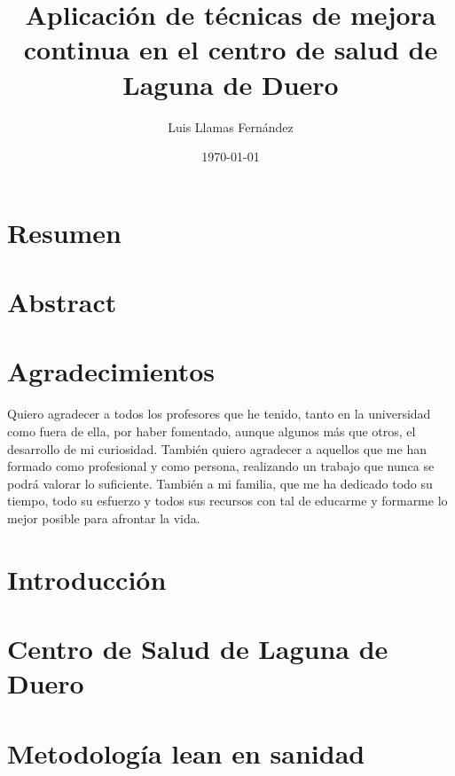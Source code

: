 \documentclass[12pt, a4paper, twoside, openright]{report}
\begin{document}
\title{Aplicación de técnicas de mejora continua en el centro de salud de Laguna de Duero}
\author{Luis Llamas Fernández}
\date{\today}
\maketitle

\thispagestyle{empty}

\chapter*{Resumen}
\lipsum[1-2]

\setcounter{page}{1}

\chapter*{Abstract}
\lipsum[3-4]

\chapter*{Agradecimientos}
Quiero agradecer a todos los profesores que he tenido, tanto en la universidad como fuera de ella, por haber fomentado, aunque algunos más que otros, el desarrollo de mi curiosidad. También quiero agradecer a aquellos que me han formado como profesional y como persona, realizando un trabajo que nunca se podrá valorar lo suficiente. También a mi familia, que me ha dedicado todo su tiempo, todo su esfuerzo y todos sus recursos con tal de educarme y formarme lo mejor posible para afrontar la vida.

\tableofcontents

\chapter{Introducción}


\chapter{Centro de Salud de Laguna de Duero}


\chapter{Metodología lean en sanidad}

\end{document}
